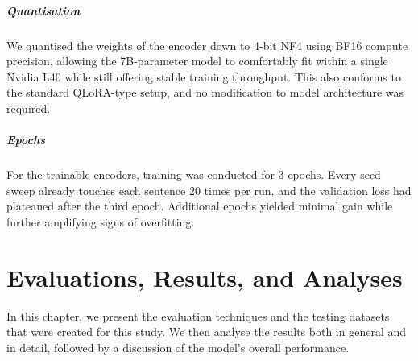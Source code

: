 \documentclass[12pt]{article}
\begin{document}
\subparagraph{Quantisation}
We quantised the weights of the encoder down to 4-bit NF4 using BF16 compute precision, allowing the 7B-parameter model to comfortably fit within a single Nvidia L40 while still offering stable training throughput. This also conforms to the standard QLoRA-type setup, and no modification to model architecture was required.

\subparagraph{Epochs}
For the trainable encoders, training was conducted for 3 epochs. Every seed sweep already touches each sentence 20 times per run, and the validation loss had plateaued after the third epoch. Additional epochs yielded minimal gain while further amplifying signs of overfitting.



\section{Evaluations, Results, and Analyses}

In this chapter, we present the evaluation techniques and the testing datasets that were created for this study. 
We then analyse the results both in general and in detail, followed by a discussion of the model's overall performance.
\end{document}
